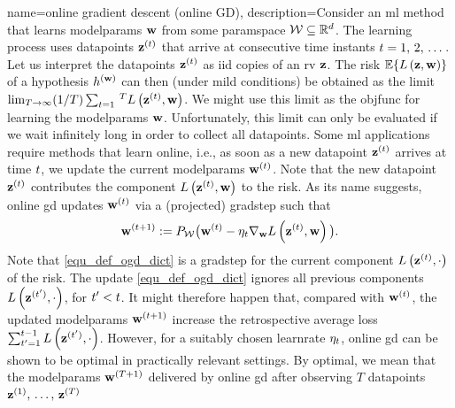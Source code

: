 {name={online gradient descent (online GD)}, 
	description={Consider  an \gls{ml} method that learns \gls{modelparams} 
		${\bf w}$ from some \gls{paramspace} $\mathcal{W} \subseteq \mathbb{R}^{d}$. 
		The learning process uses \glspl{datapoint} ${\bf z}^{(t)}$ that arrive at consecutive time instants $t=1, \,2, \,\dots$. 
		Let us interpret the \glspl{datapoint} ${\bf z}^{(t)}$ as \gls{iid} copies 
		of an \gls{rv} ${\bf z}$. The \gls{risk} $\mathbb{E}\{ L\left({\bf z},{\bf w} \right) \}$ of a 
		\gls{hypothesis} $h^{({\bf w})}$ can then (under mild conditions) be obtained as the limit 
		$\lim_{T\rightarrow \infty} (1/T)\sum_{t=1}\,^{T} L\left({\bf z}^{(t)},{\bf w} \right)$. 
		We might use this limit as the \gls{objfunc} for learning the \gls{modelparams} ${\bf w}$. 
		Unfortunately, this limit can only be evaluated if we wait infinitely long in order to collect all \glspl{datapoint}. 
		Some \gls{ml} applications require methods that learn online, i.e., as soon as a new \gls{datapoint} ${\bf z}^{(t)}$ 
		arrives at time $t$, we update the current \gls{modelparams} ${\bf w}^{(t)}$. Note that 
		the new \gls{datapoint} ${\bf z}^{(t)}$ contributes the component $L\left({\bf z}^{(t)},{\bf w} \right)$ 
		to the \gls{risk}. As its name suggests, online \gls{gd} updates ${\bf w}^{(t)}$ via a (projected) \gls{gradstep} such that
		\begin{equation} 
			\label{equ_def_ogd_dict}
 			{\bf w}^{(t+1)} := P_{\mathcal{W}}\big( {\bf w}^{(t)} - \eta_{t} \nabla_{{\bf w}} L\left({\bf z}^{(t)},{\bf w} \right)\big). 
		\end{equation} 
		Note that \eqref{equ_def_ogd_dict} is a \gls{gradstep} for the current component $L\left({\bf z}^{(t)},\cdot \right)$ 
		of the \gls{risk}. The update \eqref{equ_def_ogd_dict} ignores all previous components $L\left({\bf z}^{(t')},\cdot \right)$, 
		for $t' < t$. It might therefore happen that, compared with ${\bf w}^{(t)}$, the updated \gls{modelparams} 
		${\bf w}^{(t+1)}$ increase the retrospective average \gls{loss} $\sum_{t'=1}^{t-1} L\left({\bf z}^{(t')},\cdot \right)$. 
		However, for a suitably chosen \gls{learnrate} $\eta_{t}$, online \gls{gd} can be shown 
		to be optimal in practically relevant settings. By optimal, we mean that the \gls{modelparams} 
		${\bf w}^{(T+1)}$ delivered by online \gls{gd} after observing $T$ \glspl{datapoint} ${\bf z}^{(1)}, \,\ldots, \,{\bf z}^{(T)}$ 
}}
